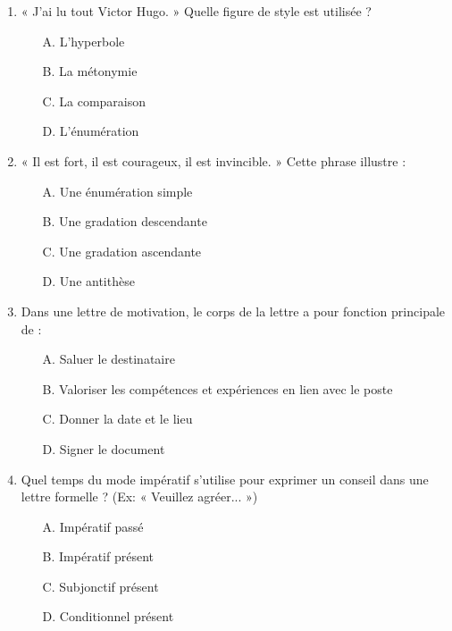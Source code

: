 \documentclass[11pt]{article}
\begin{document}
\begin{exercice}
\begin{enumerate}
    \item « J'ai lu tout Victor Hugo. » Quelle figure de style est utilisée ?
    \begin{itemize}
        \item[A.] L'hyperbole \item[B.] La métonymie \item[C.] La comparaison \item[D.] L'énumération
    \end{itemize}
    \item « Il est fort, il est courageux, il est invincible. » Cette phrase illustre :
    \begin{itemize}
        \item[A.] Une énumération simple \item[B.] Une gradation descendante \item[C.] Une gradation ascendante \item[D.] Une antithèse
    \end{itemize}
    \item Dans une lettre de motivation, le corps de la lettre a pour fonction principale de :
    \begin{itemize}
        \item[A.] Saluer le destinataire \item[B.] Valoriser les compétences et expériences en lien avec le poste \item[C.] Donner la date et le lieu \item[D.] Signer le document
    \end{itemize}
    \item Quel temps du mode impératif s'utilise pour exprimer un conseil dans une lettre formelle ? (Ex: « Veuillez agréer... »)
    \begin{itemize}
        \item[A.] Impératif passé \item[B.] Impératif présent \item[C.] Subjonctif présent \item[D.] Conditionnel présent
    \end{itemize}
\end{enumerate}
\end{exercice}
\end{document}
